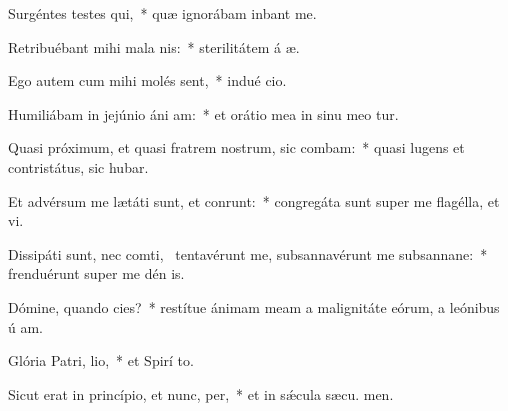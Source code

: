 \item Surgéntes testes qui,~* quæ ignorábam inbant me.
\item Retribuébant mihi mala  nis:~* sterilitátem á æ.
\item Ego autem cum mihi molés sent,~* indué cio.
\item Humiliábam in jejúnio áni am:~* et orátio mea in sinu meo tur.
\item Quasi próximum, et quasi fratrem nostrum, sic combam:~* quasi lugens et contristátus, sic hubar.
\item Et advérsum me lætáti sunt, et conrunt:~* congregáta sunt super me flagélla, et vi.
\item Dissipáti sunt, nec comti,~\pscross{} tentavérunt me, subsannavérunt me subsannane:~* frenduérunt super me dén is.
\item Dómine, quando cies?~* restítue ánimam meam a malignitáte eórum, a leónibus ú am.
\item Glória Patri,  lio,~* et Spirí to.
\item Sicut erat in princípio, et nunc,  per,~* et in sǽcula sæcu. men.

